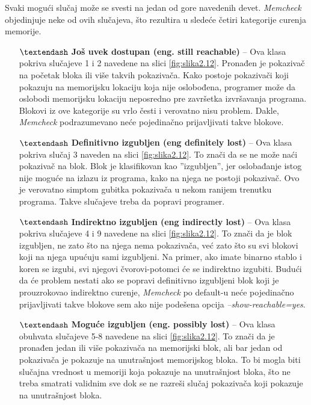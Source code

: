\documentclass[12pt,oneside]{memoir}
\theoremstyle{plain}
\theoremstyle{definition}
\begin{document}
Svaki mogući slučaj može se svesti na jedan od gore navedenih devet. \textit{Memcheck} objedinjuje neke od ovih slučajeva, što rezultira u sledeće četiri kategorije curenja memorije.
\begin{itemize}
\item[$\textendash$] \textbf{Još uvek dostupan (eng. still reachable)} – Ova klasa pokriva slučajeve 1 i 2 navedene na slici \ref{fig:slika2.12}. Pronađen je pokazivač na početak bloka ili više takvih pokazivača. Kako postoje pokazivači koji pokazuju na memorijsku lokaciju koja nije oslobođena, programer može da oslobodi memorijsku lokaciju neposredno pre završetka izvršavanja programa. Blokovi iz ove kategorije su vrlo česti i verovatno nisu problem. Dakle, \textit{Memcheck} podrazumevano neće pojedinačno prijavljivati takve blokove.
\item[$\textendash$] \textbf{Definitivno izgubljen (eng definitely lost)} – Ova klasa pokriva slučaj 3 naveden na slici \ref{fig:slika2.12}. To znači da se ne može naći pokazivač na blok. Blok je klasifikovan kao ''izgubljen'', jer oslobađanje istog nije moguće na izlazu iz programa, kako na njega ne postoji pokazivač. Ovo je verovatno simptom gubitka pokazivača u nekom ranijem trenutku programa. Takve slučajeve treba da popravi programer.
\item[$\textendash$] \textbf{Indirektno izgubljen (eng indirectly lost)} – Ova klasa pokriva slučajeve 4 i 9 navedene na slici \ref{fig:slika2.12}. To znači da je blok izgubljen, ne zato što na njega nema pokazivača, već zato što su svi blokovi koji na njega upućuju sami izgubljeni. Na primer, ako imate binarno stablo i koren se izgubi, svi njegovi čvorovi-potomci će se indirektno izgubiti. Budući da će problem nestati ako se popravi definitivno izgubljeni blok koji je prouzrokovao indirektno curenje, \textit{Memcheck} po default-u neće pojedinačno prijavljivati takve blokove sem ako nije podešena opcija \textit{–show-reachable=yes}.
\item[$\textendash$] \textbf{Moguće izgubljen (eng. possibly lost)} – Ova klasa obuhvata slučajeve 5-8 navedene na slici \ref{fig:slika2.12}. To znači da je pronađen jedan ili više pokazivača na memorijski blok, ali bar jedan od pokazivača je pokazuje na unutrašnjost memorijskog bloka. To bi mogla biti  slučajna vrednost u memoriji koja pokazuje na unutrašnjost bloka, što ne treba smatrati validnim sve dok se ne razreši slučaj pokazivača koji pokazuje na unutrašnjost bloka.
\end{itemize}
\end{document}
